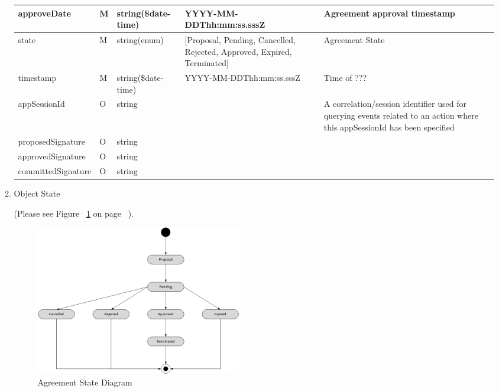 \begin{enumerate}
\begin{enumerate}
\begin{table}[H]
\begin{center}
\begin{tabular}{|p{3cm}|l|p{3cm}|p{3cm}|p{4cm}|}
approveDate			& M & string(\$date-time)	& YYYY-MM-DDThh:mm:ss.sssZ & Agreement approval timestamp \\
\hline

state 				& M & string(enum) 				&[Proposal, Pending, Cancelled, Rejected, Approved, Expired, Terminated] & Agreement State \\
\hline

timestamp			& M	& 	string(\$date-time)	& YYYY-MM-DDThh:mm:ss.sssZ	&	Time of ???  \\
\hline

appSessionId		& O &	string 				&							& 	A correlation/session identifier used for querying events related to an action 
																				where this appSessionId has been specified		\\
\hline

proposedSignature 	& O & 	string 				&							&			\\
\hline

approvedSignature 	& O & 	string 				& 							&			\\
\hline

committedSignature	& O &	string 				& 							& 			\\
\hline

\end{tabular}
\end{center}
\end{table}

\item Object State

(Please see Figure ~\ref{fig:ASD} on page ~\pageref{fig:ASD}).

\begin{figure}[H]
    \centering
    \includegraphics[width=9cm,angle=0]{./diag/Reference/AgreementState-Reference.png}
	\caption{Agreement State Diagram}
    \label{fig:ASD}
\end{figure}


\end{enumerate}
\end{enumerate}
